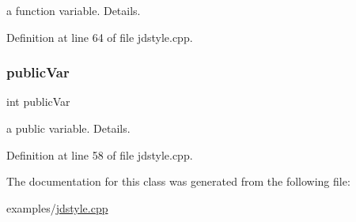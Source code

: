 a function variable. Details. 

Definition at line 64 of file jdstyle.\+cpp.

\mbox{\label{class_javadoc___test_a292887ac25652b1d8448430f583378c3}} 
\subsubsection{\texorpdfstring{public\+Var}{publicVar}}
{\footnotesize\ttfamily int public\+Var}

a public variable. Details. 

Definition at line 58 of file jdstyle.\+cpp.



The documentation for this class was generated from the following file\+:\begin{DoxyCompactItemize}
\item 
examples/\hyperlink{jdstyle_8cpp}{jdstyle.\+cpp}\end{DoxyCompactItemize}
